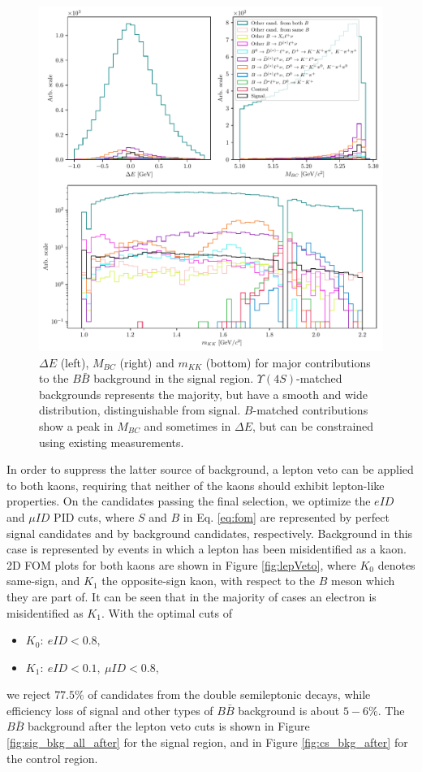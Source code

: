 \begin{figure}[H]
	\centering
	\captionsetup{width=0.8\linewidth}
	\includegraphics[width=\linewidth]{fig/sig_BKG_composition_all_before.pdf}
	\caption{$\Delta E$ (left), $M_{BC}$ (right) and $m_{KK}$ (bottom) for major contributions to the $B \bar B$ background in the signal region. $\Upsilon(4S)$-matched backgrounds represents the majority, but have a smooth and wide distribution, distinguishable from signal. $B$-matched contributions show a peak in $M_{BC}$ and sometimes in $\Delta E$, but can be constrained using existing measurements.}
	\label{fig:sig_bkg_all_before}
\end{figure} 

In order to suppress the latter source of background, a lepton veto can be applied to both kaons, requiring that neither of the kaons should exhibit lepton-like properties. On the candidates passing the final selection, we optimize the $eID$ and $\mu ID$ PID cuts, where $S$ and $B$ in Eq. \ref{eq:fom} are represented by perfect signal candidates and by background candidates, respectively. Background in this case is represented by events in which a lepton has been misidentified as a kaon. 2D FOM plots for both kaons are shown in Figure \ref{fig:lepVeto}, where $K_0$ denotes same-sign, and $K_1$ the opposite-sign kaon, with respect to the $B$ meson which they are part of. It can be seen that in the majority of cases an electron is misidentified as $K_1$. With the optimal cuts of 
\begin{itemize}
	\item $K_0:~eID < 0.8,$
	\item $K_1:~eID < 0.1,~\mu ID < 0.8,$
\end{itemize}
we reject $77.5\%$ of candidates from the double semileptonic decays, while efficiency loss of signal and other types of $B \bar B$ background is about $5-6\%$. The $B \bar B$ background after the lepton veto cuts is shown in Figure \ref{fig:sig_bkg_all_after} for the signal region, and in Figure \ref{fig:cs_bkg_after} for the control region.

